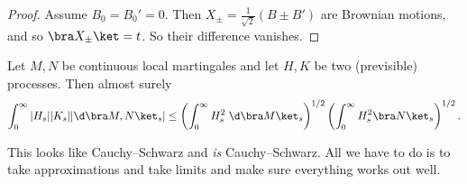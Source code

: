 \documentclass[a4paper]{article}
\begin{document}
\begin{proof}
  Assume $B_0 = B_0' = 0$. Then $X_{\pm} = \frac{1}{\sqrt{2}}(B \pm B')$ are Brownian motions, and so $\bra X_{\pm}\ket = t$. So their difference vanishes.
\end{proof}

\begin{prop}
  Let $M, N$ be continuous local martingales and let $H, K$ be two (previsible) processes. Then almost surely
  \[
    \int_0^\infty |H_s| |K_s| |\d \bra M, N\ket_s| \leq \left(\int_0^\infty H_s^2 \;\d \bra M\ket_s\right)^{1/2} \left(\int_0^\infty H_s^2 \bra N\ket_s\right)^{1/2}.
  \]
\end{prop}

This looks like Cauchy--Schwarz and \emph{is} Cauchy--Schwarz. All we have to do is to take approximations and take limits and make sure everything works out well.
\end{document}
